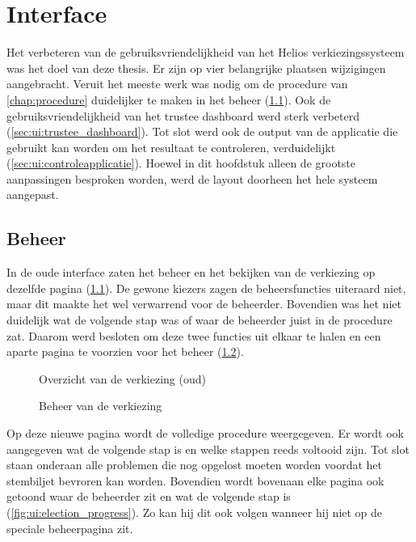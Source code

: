 % 
%

\chapter{Interface}
\label{chap:interface}

Het verbeteren van de gebruiksvriendelijkheid van het Helios verkiezingssysteem was het doel van deze thesis. Er zijn op vier belangrijke plaatsen wijzigingen aangebracht. Veruit het meeste werk was nodig om de procedure van \ref{chap:procedure} duidelijker te maken in het beheer (\ref{sec:ui:beheer}). Ook de gebruiksvriendelijkheid van het trustee dashboard werd sterk verbeterd (\ref{sec:ui:trustee_dashboard}). Tot slot werd ook de output van de applicatie die gebruikt kan worden om het resultaat te controleren, verduidelijkt (\ref{sec:ui:controleapplicatie}). Hoewel in dit hoofdstuk alleen de grootste aanpassingen besproken worden, werd de layout doorheen het hele systeem aangepast.

\section{Beheer}
\label{sec:ui:beheer}

In de oude interface zaten het beheer en het bekijken van de verkiezing op dezelfde pagina (\ref{fig:ui:elections_view_old}). De gewone kiezers zagen de beheersfuncties uiteraard niet, maar dit maakte het wel verwarrend voor de beheerder. Bovendien was het niet duidelijk wat de volgende stap was of waar de beheerder juist in de procedure zat. Daarom werd besloten om deze twee functies uit elkaar te halen en een aparte pagina te voorzien voor het beheer (\ref{fig:ui:elections_admin}).

\begin{figure}
  \caption{Overzicht van de verkiezing (oud)}
  \label{fig:ui:elections_view_old}
\end{figure}

\begin{figure}
  \caption{Beheer van de verkiezing}
  \label{fig:ui:elections_admin}
\end{figure}

\npar Op deze nieuwe pagina wordt de volledige procedure weergegeven. Er wordt ook aangegeven wat de volgende stap is en welke stappen reeds voltooid zijn. Tot slot staan onderaan alle problemen die nog opgelost moeten worden voordat het stembiljet bevroren kan worden. Bovendien wordt bovenaan elke pagina ook getoond waar de beheerder zit en wat de volgende stap is (\ref{fig:ui:election_progress}). Zo kan hij dit ook volgen wanneer hij niet op de speciale beheerpagina zit.

